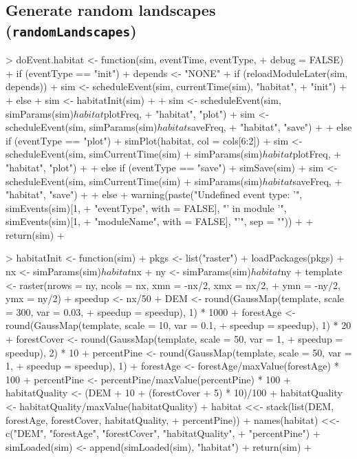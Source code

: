 \documentclass{article}
\begin{document}
\subsection{Generate random landscapes (\texttt{randomLandscapes})}

\begin{Schunk}
\begin{Soutput}
> doEvent.habitat <- function(sim, eventTime, eventType, 
+     debug = FALSE) {
+     if (eventType == "init") {
+         depends <- "NONE"
+         if (reloadModuleLater(sim, depends)) {
+             sim <- scheduleEvent(sim, currentTime(sim), "habitat", 
+                 "init")
+         }
+         else {
+             sim <- habitatInit(sim)
+         }
+         sim <- scheduleEvent(sim, simParams(sim)$habitat$plotFreq, 
+             "habitat", "plot")
+         sim <- scheduleEvent(sim, simParams(sim)$habitat$saveFreq, 
+             "habitat", "save")
+     }
+     else if (eventType == "plot") {
+         simPlot(habitat, col = cols[6:2])
+         sim <- scheduleEvent(sim, simCurrentTime(sim) + simParams(sim)$habitat$plotFreq, 
+             "habitat", "plot")
+     }
+     else if (eventType == "save") {
+         simSave(sim)
+         sim <- scheduleEvent(sim, simCurrentTime(sim) + simParams(sim)$habitat$saveFreq, 
+             "habitat", "save")
+     }
+     else {
+         warning(paste("Undefined event type: '", simEvents(sim)[1, 
+             "eventType", with = FALSE], "' in module '", simEvents(sim)[1, 
+             "moduleName", with = FALSE], "'", sep = ""))
+     }
+     return(sim)
+ }

> habitatInit <- function(sim) {
+     pkgs <- list("raster")
+     loadPackages(pkgs)
+     nx <- simParams(sim)$habitat$nx
+     ny <- simParams(sim)$habitat$ny
+     template <- raster(nrows = ny, ncols = nx, xmn = -nx/2, xmx = nx/2, 
+         ymn = -ny/2, ymx = ny/2)
+     speedup <- nx/50
+     DEM <- round(GaussMap(template, scale = 300, var = 0.03, 
+         speedup = speedup), 1) * 1000
+     forestAge <- round(GaussMap(template, scale = 10, var = 0.1, 
+         speedup = speedup), 1) * 20
+     forestCover <- round(GaussMap(template, scale = 50, var = 1, 
+         speedup = speedup), 2) * 10
+     percentPine <- round(GaussMap(template, scale = 50, var = 1, 
+         speedup = speedup), 1)
+     forestAge <- forestAge/maxValue(forestAge) * 100
+     percentPine <- percentPine/maxValue(percentPine) * 100
+     habitatQuality <- (DEM + 10 + (forestCover + 5) * 10)/100
+     habitatQuality <- habitatQuality/maxValue(habitatQuality)
+     habitat <<- stack(list(DEM, forestAge, forestCover, habitatQuality, 
+         percentPine))
+     names(habitat) <<- c("DEM", "forestAge", "forestCover", "habitatQuality", 
+         "percentPine")
+     simLoaded(sim) <- append(simLoaded(sim), "habitat")
+     return(sim)
+ }
\end{Soutput}
\end{Schunk}
\end{document}
